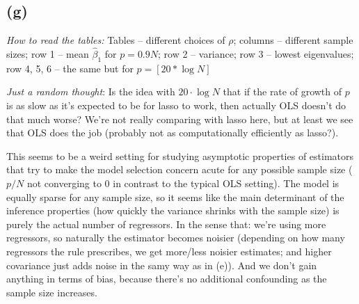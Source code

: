 \documentclass[a4paper,12pt,twoside]{article}
\begin{document}
\subsection*{(g)}

\textit{How to read the tables:} Tables -- different choices of $\rho$;
columns -- different sample sizes;
row 1 -- mean $\hat \beta_1$ for $p = 0.9 N$;
row 2 -- variance;
row 3 -- lowest eigenvalues;
row 4, 5, 6 -- the same but for $p = [20 * \log N]$

\textit{Just a random thought}: Is the idea with $20 \cdot \log N$ that if the rate of growth of $p$ is as slow as it's expected to be for lasso to work, then actually OLS doesn't do that much worse? We're not really comparing with lasso here, but at least we see that OLS does the job (probably not as computationally efficiently as lasso?).


This seems to be a weird setting for studying asymptotic properties of estimators
that try to make the model selection concern acute for any possible sample size
($p / N$ not converging to $0$ in contrast to the typical OLS setting). The model is 
equally sparse for any sample size, so it seems like the main determinant of 
the inference properties (how quickly the variance shrinks with the sample size)
is purely the actual number of regressors. In the sense that: we're using
more regressors, so naturally the estimator becomes noisier (depending on
how many regressors the rule prescribes, we get more/less noisier estimates;
and higher covariance just adds noise in the samy way as in (e)).
And we don't gain anything in terms of bias, because there's no additional confounding 
as the sample size increases.
\end{document}
